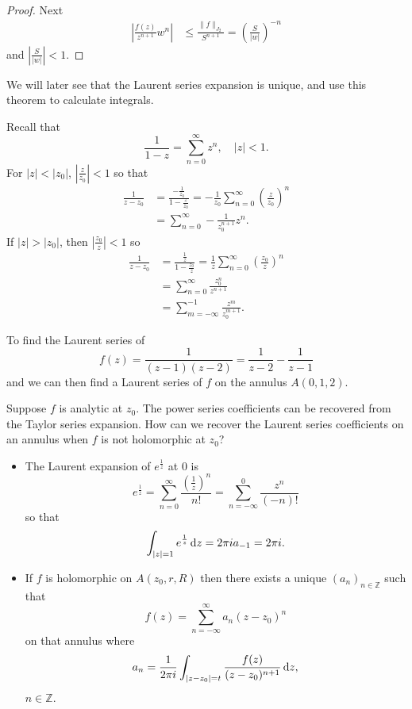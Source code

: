 \begin{proof}
Next
\begin{align*}
       \left|
        \frac{f(z)}
             {z^{n+1}}
        w^n
       \right|
& \leq \frac{\| f \|_{J_2}}
            {S^{n+1}}
  =    \left(
         \frac{S}{|w|}
       \right)^{-n}
\end{align*}
and $\left|\frac{S}{|w|}\right| < 1$.
\end{proof}

We will later see that the Laurent series expansion is unique,
and use this theorem to calculate integrals.

Recall that
$$
\frac{1}{1 - z} = \sum_{n=0}^\infty z^n, \quad |z| < 1.
$$
For $|z| < |z_0|$, $\left|\frac{z}{z_0}\right| < 1$ so that
\begin{align*}
   \frac{1}{z - z_0}
&= \frac{-\frac{1}{z_0}}{1 - \frac{z}{z_0}}
 = -\frac{1}{z_0} \sum_{n=0}^\infty \left(\frac{z}{z_0}\right)^n \\
&= \sum_{n=0}^\infty -\frac{1}{z_0^{n+1}} z^n.
\end{align*}
If $|z| > |z_0|$, then $\left|\frac{z_0}{z}\right| < 1$ so
\begin{align*}
   \frac{1}{z - z_0}
&= \frac{\frac{1}{z}}{1 - \frac{z_0}{z}}
 = \frac{1}{z}
   \sum_{n=0}^\infty
     \left(\frac{z_0}{z}\right)^n \\
&= \sum_{n=0}^\infty
     \frac{z_0^n}{z^{n+1}} \\
&= \sum_{m=-\infty}^{-1} \frac{z^m}{z_0^{m+1}}.
\end{align*}

To find the Laurent series of
$$
  f(z)
= \frac{1}{(z-1)(z-2)}
= \frac{1}{z - 2} - \frac{1}{z - 1}
$$
and we can then find a Laurent series of $f$
on the annulus $A(0, 1, 2)$.

Suppose $f$ is analytic at $z_0$. The power series coefficients can
be recovered from the Taylor series expansion. How can we recover
the Laurent series coefficients on an annulus when $f$ is not
holomorphic at $z_0$?

\begin{xmpl}
  \begin{itemize}
    \item{
      The Laurent expansion of $e^{\frac{1}{z}}$ at $0$ is
      $$
        e^{\frac{1}{z}}
      = \sum_{n=0}^{\infty}
          \frac{\left(\frac{1}{z}\right)^n}
               {n!}
      = \sum_{n=-\infty}^0 \frac{z^n}{(-n)!}
      $$
      so that
      $$
        \int_{|z| = 1}
          e^{\frac{1}{z}} \mathop{}\!\mathrm{d} z
      = 2 \pi i a_{-1} = 2 \pi i.
      $$
    }
    \item{
      If $f$ is holomorphic on $A(z_0, r, R)$ then
      there exists a unique $(a_n)_{n \in \mathbb{Z}}$ such that
      $$
      f(z) = \sum_{n=-\infty}^{\infty} a_n (z - z_0)^n
      $$
      on that annulus where
      $$
      a_n = \frac{1}{2 \pi i}
            \int_{|z - z_0| = t}
              \frac{f(z)}{(z - z_0)^{n+1}}
              \mathop{}\!\mathrm{d} z,
      $$
      $n \in \mathbb{Z}$.
    }
  \end{itemize}
\end{xmpl}

